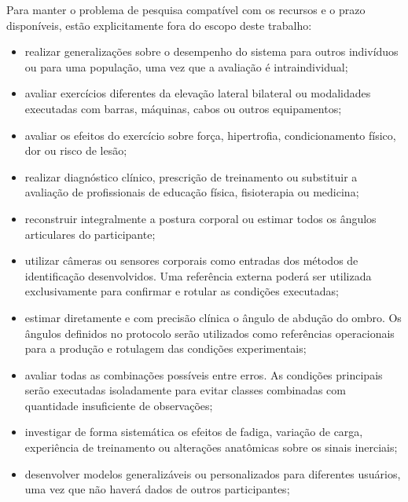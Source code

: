 Para manter o problema de pesquisa compatível com os recursos e o prazo
disponíveis, estão explicitamente fora do escopo deste trabalho:

\begin{itemize}
    \item realizar generalizações sobre o desempenho do sistema para
    outros indivíduos ou para uma população, uma vez que a avaliação é
    intraindividual;

    \item avaliar exercícios diferentes da elevação lateral bilateral ou
    modalidades executadas com barras, máquinas, cabos ou outros
    equipamentos;

    \item avaliar os efeitos do exercício sobre força, hipertrofia,
    condicionamento físico, dor ou risco de lesão;

    \item realizar diagnóstico clínico, prescrição de treinamento ou
    substituir a avaliação de profissionais de educação física,
    fisioterapia ou medicina;

    \item reconstruir integralmente a postura corporal ou estimar todos
    os ângulos articulares do participante;

    \item utilizar câmeras ou sensores corporais como entradas dos
    métodos de identificação desenvolvidos. Uma referência externa
    poderá ser utilizada exclusivamente para confirmar e rotular as
    condições executadas;

    \item estimar diretamente e com precisão clínica o ângulo de
    abdução do ombro. Os ângulos definidos no protocolo serão utilizados
    como referências operacionais para a produção e rotulagem das
    condições experimentais;

    \item avaliar todas as combinações possíveis entre erros. As
    condições principais serão executadas isoladamente para evitar
    classes combinadas com quantidade insuficiente de observações;

    \item investigar de forma sistemática os efeitos de fadiga, variação
    de carga, experiência de treinamento ou alterações anatômicas sobre
    os sinais inerciais;

    \item desenvolver modelos generalizáveis ou personalizados para
    diferentes usuários, uma vez que não haverá dados de outros
    participantes;


\end{itemize}
